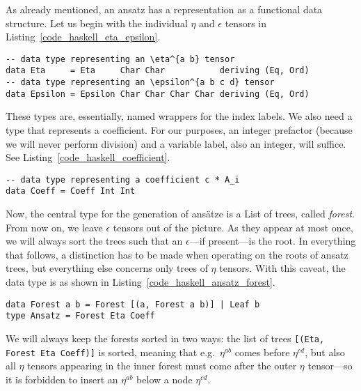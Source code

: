 As already mentioned, an ansatz has a representation as a functional data structure. Let us begin with the individual $\eta$ and $\epsilon$ tensors in Listing~\ref{code_haskell_eta_epsilon}.
\begin{code}
  \begin{verbatim}
-- data type representing an \eta^{a b} tensor
data Eta     = Eta     Char Char           deriving (Eq, Ord)
-- data type representing an \epsilon^{a b c d} tensor
data Epsilon = Epsilon Char Char Char Char deriving (Eq, Ord)
  \end{verbatim}
  \label{code_haskell_eta_epsilon}
\end{code}
These types are, essentially, named wrappers for the index labels. We also need a type that represents a coefficient. For our purposes, an integer prefactor (because we will never perform division) and a variable label, also an integer, will suffice. See Listing~\ref{code_haskell_coefficient}.
\begin{code}
  \begin{verbatim}
-- data type representing a coefficient c * A_i
data Coeff = Coeff Int Int
  \end{verbatim}
  \label{code_haskell_coefficient}
\end{code}
Now, the central type for the generation of ansätze is a List of trees, called \emph{forest}. From now on, we leave $\epsilon$ tensors out of the picture. As they appear at most once, we will always sort the trees such that an $\epsilon$---if present---is the root. In everything that follows, a distinction has to be made when operating on the roots of ansatz trees, but everything else concerns only trees of $\eta$ tensors. With this caveat, the data type is as shown in Listing~\ref{code_haskell_ansatz_forest}.
\begin{code}
  \begin{verbatim}
data Forest a b = Forest [(a, Forest a b)] | Leaf b
type Ansatz = Forest Eta Coeff
  \end{verbatim}
  \label{code_haskell_ansatz_forest}
\end{code}
We will always keep the forests sorted in two ways: the list of trees \texttt{[(Eta, Forest Eta Coeff)]} is sorted, meaning that e.g.\ $\eta^{ab}$ comes before $\eta^{cd}$, but also all $\eta$ tensors appearing in the inner forest must come after the outer $\eta$ tensor---so it is forbidden to insert an $\eta^{ab}$ below a node $\eta^{cd}$.
